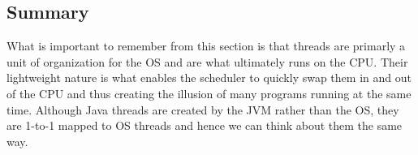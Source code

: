 \documentclass[main]{subfiles}
\begin{document}
\subsection{Summary}
What is important to remember from this section is that threads are primarly a unit of organization for the OS and are what ultimately runs on the CPU. Their lightweight nature is what enables the scheduler to quickly swap them in and out of the CPU and thus creating the illusion of many programs running at the same time. Although Java threads are created by the JVM rather than the OS, they are 1-to-1 mapped to OS threads and hence we can think about them the same way.

\end{document}
